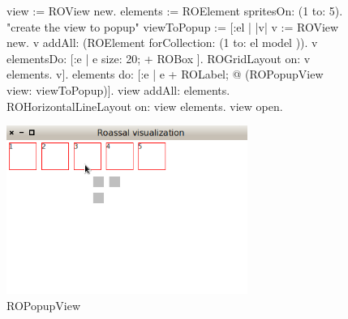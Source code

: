 \documentclass[a4paper,10pt,twoside]{book}
\begin{document}
\begin{figure}[H]
      \begin{minipage}[t]{1\textwidth}
      \vspace{0pt}
     \begin{code}{}
view := ROView new.
elements := ROElement spritesOn: (1 to: 5).
"create the view to popup"
viewToPopup :=
	[:el |
		|v| 
		v := ROView new.
		v addAll: (ROElement forCollection: (1 to: el model )).
		v elementsDo: [:e | e size: 20; + ROBox ].
		ROGridLayout on: v elements.
		v].
elements 
	do: [:e | e + ROLabel; 
				@ (ROPopupView view: viewToPopup)].
view addAll: elements.
ROHorizontalLineLayout on: view elements.
view open.
  \end{code}
   \end{minipage}
   \hfill
   \begin{minipage}[t]{1\textwidth}
	 \vspace{0pt} \raggedright
       \centering
		\includegraphics[width=0.7\textwidth]{popupView2}
   \end{minipage}
\label{fig:popupView}
\caption{ROPopupView}
\end{figure} 


%
%	
\end{document}
